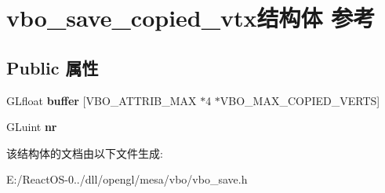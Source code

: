 \hypertarget{structvbo__save__copied__vtx}{}\section{vbo\+\_\+save\+\_\+copied\+\_\+vtx结构体 参考}
\label{structvbo__save__copied__vtx}
\subsection*{Public 属性}
\begin{DoxyCompactItemize}
\item 
\mbox{\label{structvbo__save__copied__vtx_a8d34c991d6372b1d1fd7463f13ae9cf9}} 
G\+Lfloat {\bfseries buffer} \mbox{[}V\+B\+O\+\_\+\+A\+T\+T\+R\+I\+B\+\_\+\+M\+AX $\ast$4 $\ast$V\+B\+O\+\_\+\+M\+A\+X\+\_\+\+C\+O\+P\+I\+E\+D\+\_\+\+V\+E\+R\+TS\mbox{]}
\item 
\mbox{\label{structvbo__save__copied__vtx_a4629cd33148c9b9feccbcc6f898f3812}} 
G\+Luint {\bfseries nr}
\end{DoxyCompactItemize}


该结构体的文档由以下文件生成\+:\begin{DoxyCompactItemize}
\item 
E\+:/\+React\+O\+S-\/0../dll/opengl/mesa/vbo/vbo\+\_\+save.\+h\end{DoxyCompactItemize}
